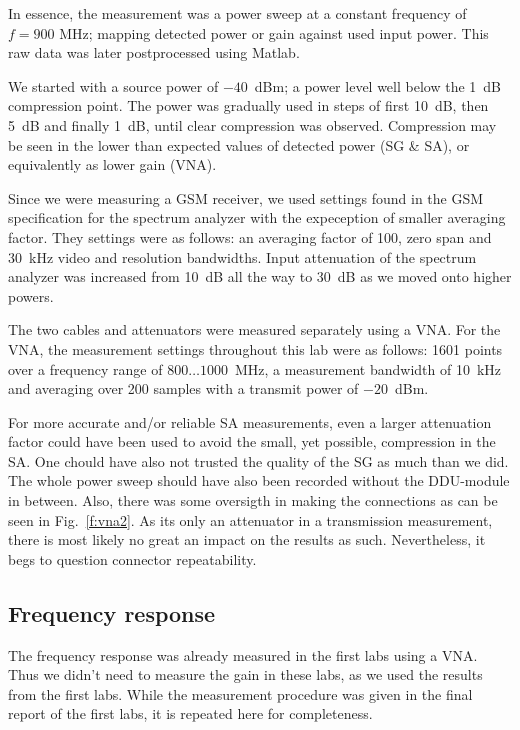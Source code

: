 \documentclass[a4paper, 12pt]{article}
\begin{document}
In essence, the measurement was a power sweep at a constant frequency of 
$f = 900$ MHz; mapping detected power or gain against used input power. 
This raw data was later postprocessed using Matlab.

We started with a source power of $-40$~dBm; a power level well below the 
1~dB compression point. The power was gradually used in steps of first 
10~dB, then 5~dB and finally 1~dB, until clear compression was observed. 
Compression may be seen in the lower than expected values of detected 
power (SG \& SA), or equivalently as lower gain (VNA).

Since we were measuring a GSM receiver, we used settings found in the GSM 
specification for the spectrum analyzer with the expeception of smaller 
averaging factor. They settings were as follows: an averaging factor of 100, 
zero span and 30~kHz video and resolution bandwidths. Input attenuation of the 
spectrum analyzer was increased from 10~dB all the way to 30~dB as we moved onto 
higher powers. 

The two cables and attenuators were measured separately using a VNA. For the VNA, 
the measurement settings throughout this lab were as follows: 1601 points over 
a frequency range of $800 \ldots 1000$~MHz, a measurement bandwidth of 10~kHz 
and averaging over 200 samples with a transmit power of $-20$~dBm.

For more accurate and/or reliable SA measurements, even a larger attenuation factor 
could have been used to avoid the small, yet possible, compression in the SA. One 
chould have also not trusted the quality of the SG as much than we did. The whole 
power sweep should have also been recorded without the DDU-module in between.
Also, there was some oversigth in making the connections as can be seen in 
Fig.~\ref{f:vna2}. As its only an attenuator in a transmission measurement, 
there is most likely no great an impact on the results as such. Nevertheless, 
it begs to question connector repeatability.


\subsection{Frequency response}

The frequency response was already measured in the first labs using a VNA. Thus 
we didn't need to measure the gain in these labs, as we used the results from 
the first labs. While the measurement procedure was given in the final report of 
the first labs, it is repeated here for completeness.
\end{document}
